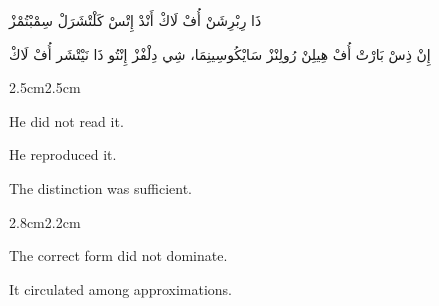 \vspace{1em}

\begin{center}
\begin{AR}
ذَا رِبْرِشَنْ أُفْ لَاكْ أَنْدْ إِتْسْ كَلْتْشَرَلْ سِمْبْتُمْزْ
\end{AR}
\end{center}

\vspace{1em}

\begin{center}
\begin{AR}
إِنْ ذِسْ بَارْتْ أُفْ هِيلِنْ رُولِنْزْ سَايْكُوسِينِمَا،
شِي دِلْفْزْ إِنْتُو ذَا نَيْتْشَر أُفْ لَاكْ
\end{AR}
\end{center}

\vspace{3em}

\begin{adjustwidth}{2.5cm}{2.5cm}

He did not read it.

\medskip

He reproduced it.

\vspace{2em}

The distinction was sufficient.

\vspace{3em}

\end{adjustwidth}

\begin{center}
\end{center}

\vspace{0.5em}

\begin{center}
\end{center}

\vspace{0.5em}

\begin{center}
\end{center}

\vspace{3em}

\begin{adjustwidth}{2.8cm}{2.2cm}

The correct form did not dominate.

\medskip

It circulated among approximations.

\vspace{3em}

\end{adjustwidth}

